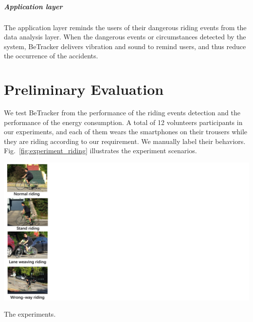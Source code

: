 \documentclass{sigchi-ext}
\def\sysname{BeTracker }
\begin{document}
\subparagraph{Application layer}
The application layer reminds the users of their dangerous riding events from the data analysis layer. When the dangerous events or circumstances detected by the system, \sysname delivers vibration and sound to remind users, and thus reduce the occurrence of the accidents. 


\section{Preliminary Evaluation}
We test \sysname from the performance of the riding events detection and the performance of the energy consumption. A total of 12 volunteers participants in our experiments, and each of them wears the smartphones on their trousers while they are riding according to our requirement. We manually label their behaviors. Fig.~\ref{fig:experiment_riding} illustrates the experiment scenarios. 




\begin{marginfigure}[0 pc]
	\begin{minipage}{1\marginparwidth}
		\centering
		\includegraphics[width=0.6\marginparwidth]{figures/experiment_riding1.pdf}
		\caption{The experiments. } ~\label{fig:experiment_riding}
	\end{minipage}
\end{marginfigure}
\end{document}
